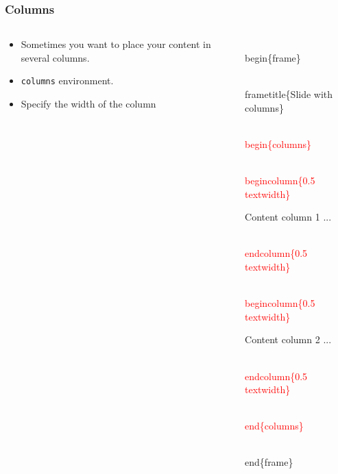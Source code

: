 \documentclass[10pt]{beamer}
\newcommand{\code}{\textcolor{red}}
\begin{document}
\begin{frame}
  \frametitle{Columns}

  \begin{columns}
       
       
 \begin{column}{0.5\textwidth}
   \begin{itemize}



\item Sometimes you want to place your content in several columns.
\item \texttt{columns} environment.
\item Specify the width of the column

  \end{itemize}    
      
 \end{column}
 
\begin{column}{0.5\textwidth}
   
   
 \begin{semiverbatim}
 
\\begin\{frame\}

\\frametitle\{Slide with columns\}

\code{\\begin\{columns\}}

 \code{\\begin{column}\{0.5\\textwidth\}}
 
 Content column 1 ...
 
  \code{\\end{column}\{0.5\\textwidth\}}
   
  \code{\\begin{column}\{0.5\\textwidth\}}
  
  Content column 2 ...
 
  \code{\\end{column}\{0.5\\textwidth\}}

\code{\\end\{columns\}}

\\end\{frame\}


 
\end{semiverbatim}

 \end{column}
 

       \end{columns}


\end{frame}
\end{document}
